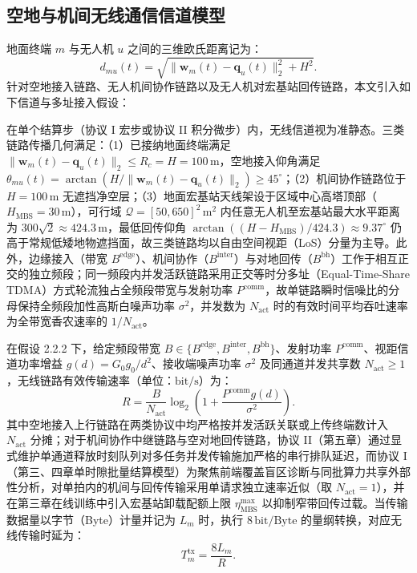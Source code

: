 \subsection{空地与机间无线通信信道模型}
\label{subsec:uav-mec}

地面终端 $m$ 与无人机 $u$ 之间的三维欧氏距离记为：
\begin{equation}
    d_{mu}(t)=\sqrt{\|\mathbf w_m(t)-\mathbf q_u(t)\|_2^2+H^2}.
    \label{eq:ch2-distance}
\end{equation}
针对空地接入链路、无人机间协作链路以及无人机对宏基站回传链路，本文引入如下信道与多址接入假设：

\begin{assumption}[视距主导传播与频段隔离等时分共享假设]
在单个结算步（协议 I 宏步或协议 II 积分微步）内，无线信道视为准静态。三类链路传播几何满足：（1）已接纳地面终端满足 $\|\mathbf{w}_m(t)-\mathbf{q}_u(t)\|_2\leq R_c=H=100\,\mathrm{m}$，空地接入仰角满足 $\theta_{mu}(t)=\arctan(H/\|\mathbf{w}_m(t)-\mathbf{q}_u(t)\|_2)\geq 45^\circ$；（2）机间协作链路位于 $H=100\,\mathrm{m}$ 无遮挡净空层；（3）地面宏基站天线架设于区域中心高塔顶部（$H_{\mathrm{MBS}}=30\,\mathrm{m}$），可行域 $\mathcal{Q}=[50,650]^2\,\mathrm{m}^2$ 内任意无人机至宏基站最大水平距离为 $300\sqrt{2}\approx 424.3\,\mathrm{m}$，最低回传仰角 $\arctan((H-H_{\mathrm{MBS}})/424.3)\approx 9.37^\circ$ 仍高于常规低矮地物遮挡面，故三类链路均以自由空间视距（LoS）分量为主导\cite{zeng2016wireless,mozaffari2019tutorial}。此外，边缘接入（带宽 $B^{\mathrm{edge}}$）、机间协作（$B^{\mathrm{inter}}$）与对地回传（$B^{\mathrm{bh}}$）工作于相互正交的独立频段；同一频段内并发活跃链路采用正交等时分多址（Equal-Time-Share TDMA）方式轮流独占全频段带宽与发射功率 $P^{\mathrm{comm}}$，故单链路瞬时信噪比的分母保持全频段加性高斯白噪声功率 $\sigma^2$，并发数为 $N_{\mathrm{act}}$ 时的有效时间平均吞吐速率为全带宽香农速率的 $1/N_{\mathrm{act}}$。
\end{assumption}

在假设 2.2.2 下，给定频段带宽 $B\in\{B^{\mathrm{edge}},B^{\mathrm{inter}},B^{\mathrm{bh}}\}$、发射功率 $P^{\mathrm{comm}}$、视距信道功率增益 $g(d)=G_0g_0/d^2$、接收端噪声功率 $\sigma^2$ 及同通道并发共享数 $N_{\mathrm{act}}\ge 1$，无线链路有效传输速率（单位：$\mathrm{bit/s}$）为：
\begin{equation}
    R=\frac{B}{N_{\mathrm{act}}}\log_2\left(1+\frac{P^{\mathrm{comm}}g(d)}{\sigma^2}\right).
    \label{eq:ch2-link-rate}
\end{equation}
其中空地接入上行链路在两类协议中均严格按并发活跃关联或上传终端数计入 $N_{\mathrm{act}}$ 分摊；对于机间协作中继链路与空对地回传链路，协议 II（第五章）通过显式维护单通道释放时刻队列对多任务并发传输施加严格的串行排队延迟，而协议 I（第三、四章单时隙批量结算模型）为聚焦前端覆盖盲区诊断与同批算力共享外部性分析，对单拍内的机间与回传传输采用单请求独立速率近似（取 $N_{\mathrm{act}}=1$），并在第三章在线训练中引入宏基站卸载配额上限 $\eta_{\mathrm{MBS}}^{\max}$ 以抑制窄带回传过载。当传输数据量以字节（Byte）计量并记为 $L_m$ 时，执行 $8\,\mathrm{bit/Byte}$ 的量纲转换，对应无线传输时延为：
\begin{equation}
    T^{\mathrm{tx}}_m=\frac{8L_m}{R}.
    \label{eq:ch2-byte-bit}
\end{equation}

